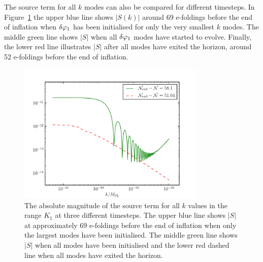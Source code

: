 The source term for all $k$ modes can also be compared for different timesteps. In
Figure~\ref{fig:src-3ns} the upper blue line shows $|S(k)|$ around 69 e-foldings
before the end of
inflation when $\delta\varphi_{1}$ has been initialised for only the very smallest $k$
modes. The middle green
line shows $|S|$ when all $\delta\varphi_{1}$ modes have started to evolve. Finally, the lower
red line illustrates $|S|$
after all modes have exited the horizon, around 52 e-foldings before the end of
inflation.
% 
\begin{figure}[htbp]
\centering
\includegraphics[width=0.8\textwidth]{numerical/graphs/src_3ns-large}
\caption[Source term at three different times]{The absolute magnitude of the source 
term for all $k$ values in the range $K_1$ at three different timesteps. The upper
blue line shows $|S|$ at approximately $69$ e-foldings before the end of inflation
when
only the largest modes have been initialised. The middle green line shows $|S|$ when
all modes
have been initialised and the lower red dashed line when all modes have
exited the horizon.}
\label{fig:src-3ns}
\end{figure}
% 




